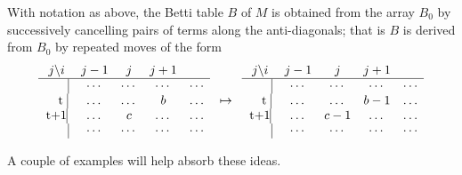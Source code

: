 \begin{proposition}\cite{Peeva}\label{cancellation}
With notation as above, the Betti table $B$ of $M$ is obtained from the array $B_{0}$ by successively cancelling pairs of terms along the anti-diagonals; that is $B$ is derived from $B_{0}$ by repeated moves of the form
\begin{align*}
\begin{matrix}
j \backslash i     &j-1&j&j+1\\ \hline
\text{\kern 19pt}\vline &\cdots&\cdots&\cdots&\cdots\\
\text{ \kern 7pt t }\vline &\dots&\dots&b&\dots\\
\text{t+1}\vline &\dots&c&\dots&\dots\\
\text{\kern 19pt}\vline &\cdots&\cdots&\cdots&\cdots\\
\end{matrix}
\quad \mapsto\quad
\begin{matrix}
j \backslash i     &j-1&j&j+1\\ \hline
\text{\kern 19pt}\vline &\cdots&\cdots&\cdots&\cdots\\
\text{ \kern 7pt t }\vline &\dots&\dots&b-1&\dots\\
\text{t+1}\vline &\dots&c-1&\dots&\dots\\
\text{\kern 19pt}\vline &\cdots&\cdots&\cdots&\cdots\\
\end{matrix}
\end{align*}
\end{proposition}

 A couple of examples will help absorb these ideas.


